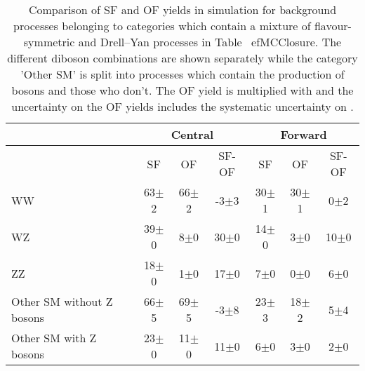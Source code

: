 
\begin{table}[hbtp]
 \renewcommand{\arraystretch}{1.3}
 \setlength{\belowcaptionskip}{6pt}
 \centering
 \caption{Comparison of SF and OF yields in simulation for background processes belonging to categories which contain a mixture of flavour-symmetric and Drell--Yan processes in Table~
ef{MCClosure}. The different diboson combinations are shown separately while the category 'Other SM' is split into processes which contain the production of \Z bosons and those who don't. The OF yield is multiplied with \Rsfof and the uncertainty on the OF yields includes the systematic uncertainty on \Rsfof.}
  \label{tab:MCClosureDetails}
  \begin{tabular}{l| ccc | ccc }
    							& \multicolumn{3}{c|}{Central} & \multicolumn{3}{c}{Forward} \\ 

    \hline
								&  SF        & OF  &  SF-OF  & SF   &  OF        & SF-OF \\ 

    \hline
WW & 63$\pm$2 & 66$\pm$2 & -3$\pm$3 & 30$\pm$1 & 30$\pm$1 & 0$\pm$2 \\
WZ & 39$\pm$0 & 8$\pm$0 & 30$\pm$0 & 14$\pm$0 & 3$\pm$0 & 10$\pm$0 \\
ZZ & 18$\pm$0 & 1$\pm$0 & 17$\pm$0 & 7$\pm$0 & 0$\pm$0 & 6$\pm$0 \\
Other SM without Z bosons & 66$\pm$5 & 69$\pm$5 & -3$\pm$8 & 23$\pm$3 & 18$\pm$2 & 5$\pm$4 \\
Other SM with Z bosons & 23$\pm$0 & 11$\pm$0 & 11$\pm$0 & 6$\pm$0 & 3$\pm$0 & 2$\pm$0 \\


  \end{tabular}
\end{table}
